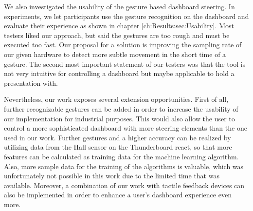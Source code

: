 We also investigated the usability of the gesture based dashboard steering. 
In experiments, we let participants use the gesture recognition on the dashboard and evaluate their experience as shown in chapter \ref{ch:Results:sec:Usability}.
Most testers liked our approach, but said the gestures are too rough and must be executed too fast.
Our proposal for a solution is improving the sampling rate of our given hardware to detect more subtle movement in the short time of a gesture.
The second most important statement of our testers was that the tool is not very intuitive for controlling a dashboard but maybe applicable to hold a presentation with.

Nevertheless, our work exposes several extension opportunities. 
First of all, further recognizable gestures can be added in order to increase the usability of our implementation for industrial purposes. 
This would also allow the user to control a more sophisticated dashboard with more steering elements than the one used in our work.
Further gestures and a higher accuracy can be realized by utilizing data from the Hall sensor on the Thunderboard react, so that more features can be calculated as training data for the machine learning algorithm. 
Also, more sample data for the training of the algorithms is valuable, which was unfortunately not possible in this work due to the limited time that was available. 
Moreover, a combination of our work with tactile feedback devices can also be implemented in order to enhance a user’s dashboard experience even more. 


